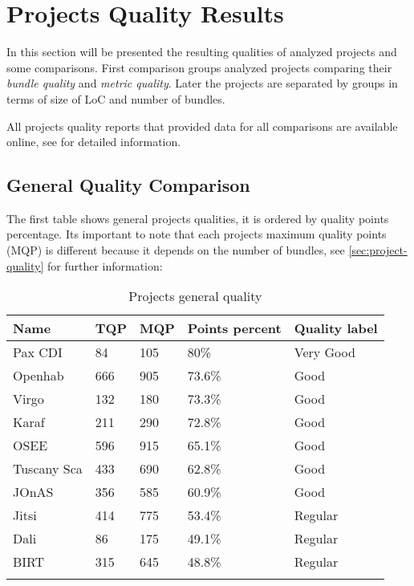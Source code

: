 \section{Projects Quality Results}
In this section will be presented the resulting qualities of analyzed projects and some comparisons. First comparison groups analyzed projects comparing their \emph{bundle quality} and \emph{metric quality}. Later the projects are separated by groups in terms of size of LoC and number of bundles.

All projects quality reports that provided data for all comparisons are available online, see \citep{intrabundle reports 2014} for detailed information. 

\subsection{General Quality Comparison}

The first table shows general projects qualities, it is ordered by quality points percentage. Its important to note that each projects maximum quality points (MQP) is different because it depends on the number of bundles, see \ref{sec:project-quality} for further information:

\begin{table}[h]
\caption{Projects general quality}
\label{projects-general-quality}
    \begin{tabular}{  p{3cm} | p{2cm} | p{2cm} | p{3cm} | p{4cm}}
    \Xhline{2\arrayrulewidth}
    Name & TQP & MQP & Points percent & Quality label \\  \hline
    Pax CDI & 84 & 105 & 80\% & Very Good\\ \hline 
    Openhab &   666 & 905 & 73.6\% & Good\\ \hline
    Virgo & 132 & 180 & 73.3\% & Good\\ \hline
    Karaf & 211 & 290 & 72.8\% & Good\\ \hline
    OSEE & 596 & 915 & 65.1\% & Good\\ \hline
    Tuscany Sca & 433 & 690 & 62.8\% & Good\\ \hline
    JOnAS & 356 & 585 & 60.9\%  & Good\\ \hline
    Jitsi & 414 & 775 & 53.4\% & Regular\\ \hline
    Dali & 86 & 175 & 49.1\%  & Regular\\ \hline
    BIRT & 315 & 645 & 48.8\% & Regular\\ 
   \Xhline{2\arrayrulewidth}
    \end{tabular}
\end{table}
\FloatBarrier 


